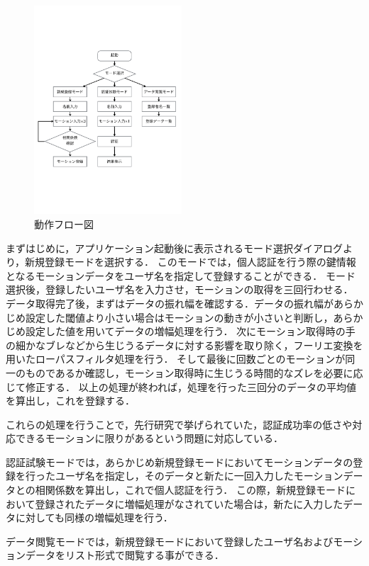 \documentclass[11pt]{jarticle}
\begin{document}
\begin{figure}
    \begin{center}
        \includegraphics[width=55mm, bb=0 183 594 670]{Flow.pdf}
        \caption{動作フロー図}
        \label{flow}
    \end{center}
\end{figure}

まずはじめに，アプリケーション起動後に表示されるモード選択ダイアログより，新規登録モードを選択する．
このモードでは，個人認証を行う際の鍵情報となるモーションデータをユーザ名を指定して登録することができる．
モード選択後，登録したいユーザ名を入力させ，モーションの取得を三回行わせる．
データ取得完了後，まずはデータの振れ幅を確認する．データの振れ幅があらかじめ設定した閾値より小さい場合はモーションの動きが小さいと判断し，あらかじめ設定した値を用いてデータの増幅処理を行う．
次にモーション取得時の手の細かなブレなどから生じうるデータに対する影響を取り除く，フーリエ変換を用いたローパスフィルタ処理を行う．
そして最後に回数ごとのモーションが同一のものであるか確認し，モーション取得時に生じうる時間的なズレを必要に応じて修正する．
以上の処理が終われば，処理を行った三回分のデータの平均値を算出し，これを登録する．

これらの処理を行うことで，先行研究で挙げられていた，認証成功率の低さや対応できるモーションに限りがあるという問題に対応している．

認証試験モードでは，あらかじめ新規登録モードにおいてモーションデータの登録を行ったユーザ名を指定し，そのデータと新たに一回入力したモーションデータとの相関係数を算出し，これで個人認証を行う．
この際，新規登録モードにおいて登録されたデータに増幅処理がなされていた場合は，新たに入力したデータに対しても同様の増幅処理を行う．

データ閲覧モードでは，新規登録モードにおいて登録したユーザ名およびモーションデータをリスト形式で閲覧する事ができる．
\end{document}
